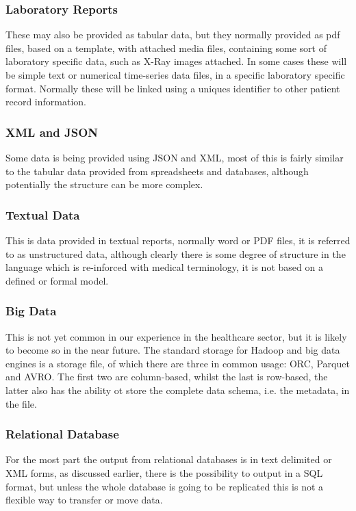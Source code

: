 \documentclass[runningheads]{llncs}
\begin{document}
	\subsubsection{Laboratory Reports}
	These may also be provided as tabular data, but they normally provided as pdf files, based on a template, with attached media files, containing some sort of laboratory specific data, such as X-Ray images attached. In some cases these will be simple text or numerical time-series data files, in a specific laboratory specific format. Normally these will be linked using a uniques identifier to other patient record information.
	\subsubsection{XML and JSON}
	Some data is being provided using JSON and XML, most of this is fairly similar to the tabular data provided from spreadsheets and databases, although potentially the structure can be more complex.
	\subsubsection{Textual Data}
	This is data provided in textual reports, normally word or PDF files, it is referred to as unstructured data, although clearly there is some degree of structure in the language which is re-inforced with medical terminology, it is not based on a defined or formal model.
	\subsubsection{Big Data}
	This is not yet common in our experience in the healthcare sector, but it is likely to become so in the near future. The standard storage for Hadoop and big data engines is a storage file, of which there are three in common usage: ORC, Parquet and AVRO. The first two are column-based, whilst the last is row-based, the latter also has the ability ot store the complete data schema, i.e. the metadata, in the file.
	\subsubsection{Relational Database}
	For the most part the output from relational databases is in text delimited or XML forms, as discussed earlier, there is the possibility to output in a SQL format, but unless the whole database is going to be replicated this is not a flexible way to transfer or move data.
\end{document}
